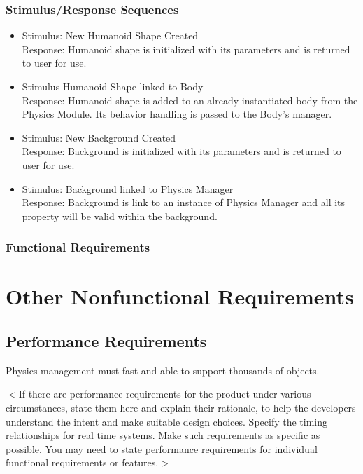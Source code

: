 \documentclass{scrreprt}
\begin{document}
\subsection{Stimulus/Response Sequences}
\begin{itemize}

\item Stimulus:		New Humanoid Shape Created\\
Response: 		Humanoid shape is initialized with its parameters and is returned to user for use.\\

\item Stimulus 		Humanoid Shape linked to Body\\
Response:	           Humanoid shape is added to an already instantiated body from the Physics Module. Its behavior handling is passed to the Body's manager.\\

\item Stimulus:		New Background Created\\
Response: 		Background is initialized with its parameters and is returned to user for use.\\

\item Stimulus:		Background linked to Physics Manager\\
Response: 		Background is link to an instance of Physics Manager and all its property will be valid within the background.\\

\end{itemize}
\subsection{Functional Requirements}


\chapter{Other Nonfunctional Requirements}

\section{Performance Requirements}

Physics management must fast and able to support thousands of objects.


$<$If there are performance requirements for the product under various 
circumstances, state them here and explain their rationale, to help the 
developers understand the intent and make suitable design choices. Specify the 
timing relationships for real time systems. Make such requirements as specific 
as possible. You may need to state performance requirements for individual 
functional requirements or features.$>$
\end{document}
